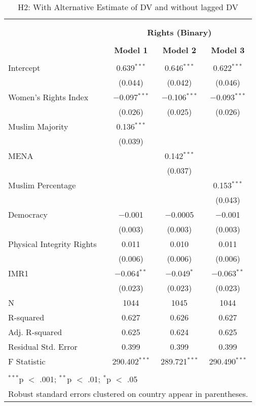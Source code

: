 
\begin{table}[!htbp] \centering 
  \caption{H2: With Alternative Estimate of DV and without lagged DV} 
  \label{} 
\begin{tabular}{@{\extracolsep{5pt}}lccc} 
\\[-1.8ex]\hline \\[-1.8ex] 
\\[-1.8ex] & \multicolumn{3}{c}{\textbf{Rights (Binary)}} \\ 
\\[-1.8ex] & \textbf{Model 1} & \textbf{Model 2} & \textbf{Model 3}\\ 
\hline \\[-1.8ex] 
 Intercept & 0.639$^{***}$ & 0.646$^{***}$ & 0.622$^{***}$ \\ 
  & (0.044) & (0.042) & (0.046) \\ 
  Women's Rights Index & $-$0.097$^{***}$ & $-$0.106$^{***}$ & $-$0.093$^{***}$ \\ 
  & (0.026) & (0.025) & (0.026) \\ 
  Muslim Majority & 0.136$^{***}$ &  &  \\ 
  & (0.039) &  &  \\ 
  MENA &  & 0.142$^{***}$ &  \\ 
  &  & (0.037) &  \\ 
  Muslim Percentage &  &  & 0.153$^{***}$ \\ 
  &  &  & (0.043) \\ 
  Democracy & $-$0.001 & $-$0.0005 & $-$0.001 \\ 
  & (0.003) & (0.003) & (0.003) \\ 
  Physical Integrity Rights & 0.011 & 0.010 & 0.011 \\ 
  & (0.006) & (0.006) & (0.006) \\ 
  IMR1 & $-$0.064$^{**}$ & $-$0.049$^{*}$ & $-$0.063$^{**}$ \\ 
  & (0.023) & (0.023) & (0.023) \\ 
 N & 1044 & 1045 & 1044 \\ 
R-squared & 0.627 & 0.626 & 0.627 \\ 
Adj. R-squared & 0.625 & 0.624 & 0.625 \\ 
Residual Std. Error & 0.399 & 0.399 & 0.399 \\ 
F Statistic & 290.402$^{***}$ & 289.721$^{***}$ & 290.490$^{***}$ \\ 
\hline \\[-1.8ex] 
\multicolumn{4}{l}{$^{***}$p $<$ .001; $^{**}$p $<$ .01; $^{*}$p $<$ .05} \\ 
\multicolumn{4}{l}{Robust standard errors clustered on country appear in parentheses.} \\ 
\end{tabular} 
\end{table} 
